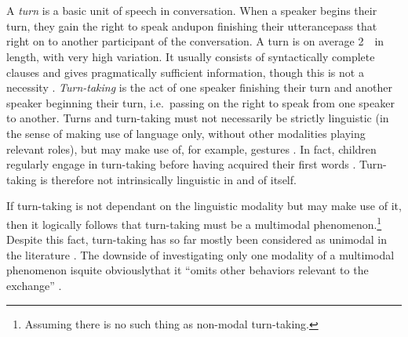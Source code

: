 
\chapter{\introduction}
\label{ch:intro}
A \emph{turn} is a basic unit of speech in conversation.
When a speaker begins their turn, they gain the right to speak and\dash upon finishing their utterance\dash pass that right on to another participant of the conversation.
A turn is on average 2~\s\ in length, with very high variation.
It usually consists of syntactically complete clauses and gives pragmatically sufficient information, though this is not a necessity \citep[]{levinson_turn-taking_2016}.
\emph{Turn-taking} is the act of one speaker finishing their turn and another speaker beginning their turn, i.e.\ passing on the right to speak from one speaker to another. %
Turns and turn-taking must not necessarily be strictly linguistic (in the sense of making use of language only, without other modalities playing relevant roles), but may make use of, for example, gestures \citep[]{schmitt_zur_2005}.
In fact, children regularly engage in turn-taking before having acquired their first words \citep[]{casillas_turn-taking_2016}.
Turn-taking is therefore not intrinsically linguistic in and of itself.

If turn-taking is not dependant on the linguistic modality but may make use of it, then it logically follows that turn-taking must be a multimodal phenomenon.\footnote{%
Assuming there is no such thing as non-modal turn-taking.}
Despite this fact, turn-taking has so far mostly been considered as unimodal in the literature \citep[]{rohlfing_multimodal_underreview}.
The downside of investigating only one modality of a multimodal phenomenon is\dash quite obviously\dash that it ``omits other behaviors relevant to the exchange'' \citep[]{rohlfing_multimodal_underreview}.

